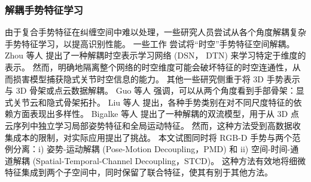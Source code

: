 

\subsubsection{解耦手势特征学习}
由于复合手势特征在纠缠空间\cite{zhou2023unified,LI2024110536}中难以处理，一些研究人员尝试从各个角度解耦复杂手势特征学习，以提高识别性能。
一些工作\cite{zhou2022decoupling,LI2024110536} 尝试将“时空”手势特征空间解耦。
Zhou 等人 \cite{zhou2023unified} 提出了一种解耦时空表示学习网络 (DSN， DTN) 来学习特定于维度的表示。
然而，明确地隔离整个网络的时空维度可能会破坏特征的时空连通性，从而损害模型捕获隐式关节时空信息的能力。
其他一些研究侧重于将 3D 手势表示与 3D 骨架或点云数据解耦。
Guo 等人 \cite{GUO2021108044} 强调，可以从两个角度看到手部骨架：显式关节云和隐式骨架拓扑。
Liu 等人\cite{liu2020decoupled} 提出，各种手势类别在对不同尺度特征的依赖方面表现出多样性。
Bigalke 等人 \cite{bigalke2021fusing} 提出了一种解耦的双流模型，用于从 3D 点云序列中独立学习局部姿势特征和全局运动特征。
然而，这种方法受到高数据收集成本的限制，对实际应用提出了挑战。
本文试图同时将 RGB-D 手势与两个范例分离：i) 姿势-运动解耦 (Pose-Motion Decoupling，PMD) 和 ii) 空间-时间-通道解耦 (Spatial-Temporal-Channel Decoupling，STCD)。
这种方法有效地将细微特征集成到两个子空间中，同时保留了联合特征，使其有别于其他方法。

